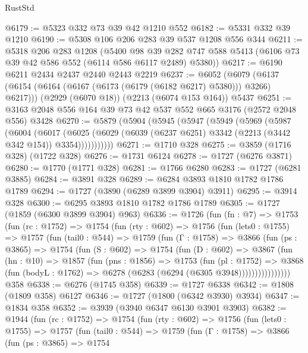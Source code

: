 \begin{lexlean}{RustStd}
\begin{coremodule}
@6179 := @5323 @332 @73 @39 @42 @1210 @552
@6182 := @5331 @332 @39 @1210
@6190 := @5308 @106 @206 @283 @39 @537 @1208 @556 @344
@6211 := @5318
    @206
    @283
    @1208
    (@5400
      @98
      @39
      @282
      @747
      @588
      @5413
      (@6106 @73 @39 @42 @586 @552 (@6114 @586 @6117 @2489) @5380))
@6217 := @6190 @6211 @2434 @2437 @2440 @2443 @2219
@6237 := @6052
    (@6079 (@6137 (@6154 (@6164 (@6167 (@6173 (@6179 (@6182 @6217) @5380))) @3266) @6217)))
    (@2929 (@6070 @18))
    (@2213 (@6074 @153 @164))
    @5437
@6251 := @3163 @2048 @556 @164 @39 @73 @42 @537 @552 @665 @3176 (@2572 @2048 @556) @3428
@6270 := @5879
    (@5904
      (@5945
        (@5947
          (@5949
            (@5969
              (@5987
                (@6004
                  (@6017
                    (@6025
                      (@6029 (@6039 (@6237 @6251) @3342 (@2213 (@3442 @342 @154)) @3354)))))))))))
@6271 := @1710 @328
@6275 := @3859 (@1716 @328) (@1722 @328)
@6276 := @1731 @6124
@6278 := @1727 (@6276 @3871)
@6280 := @1770 (@1771 @328)
@6281 := @1766 @6280
@6283 := @1727 (@6281 @3885)
@6284 := @3891 @328
@6289 := @6284 @3893 @1810 @1782 @1786 @1789
@6294 := @1727 (@3890 (@6289 @3899 @3904) @3911)
@6295 := @3914 @328
@6300 := @6295 @3893 @1810 @1782 @1786 @1789
@6305 := @1727 (@1859 (@6300 @3899 @3904) @963)
@6336 := @1726
    (fun (fn : @7) =>
    @1753
      (fun (rc : @1752) =>
      @1754
        (fun (rty : @602) =>
        @1756
          (fun (lets0 : @1755) =>
          @1757
            (fun (tail0 : @544) =>
            @1759
              (fun (Γ : @1758) =>
              @3866
                (fun (ps : @3865) =>
                @1754
                  (fun (S : @602) =>
                  @1754
                    (fun (D : @602) =>
                    @3867
                      (fun (hn : @10) =>
                      @1857
                        (fun (pns : @1856) =>
                        @1753
                          (fun (pl : @1752) =>
                          @3868
                            (fun (bodyL : @1762) => @6278 (@6283 (@6294 (@6305 @3948))))))))))))))))
    @358
@6338 := @6276 (@1745 @358)
@6339 := @1727 @6338
@6342 := @1808 (@1809 @358) @6127
@6346 := @1727 (@1800 (@6342 @3930) @3934)
@6347 := @1834 @358
@6352 := @3939 (@3940 @6347 @6130 @3901 @3903)
@6382 := @1944
    (fun (rc : @1752) =>
    @1754
      (fun (rty : @602) =>
      @1756
        (fun (lets0 : @1755) =>
        @1757
          (fun (tail0 : @544) =>
          @1759
            (fun (Γ : @1758) =>
            @3866
              (fun (ps : @3865) =>
              @1754

\end{coremodule}
\end{lexlean}
